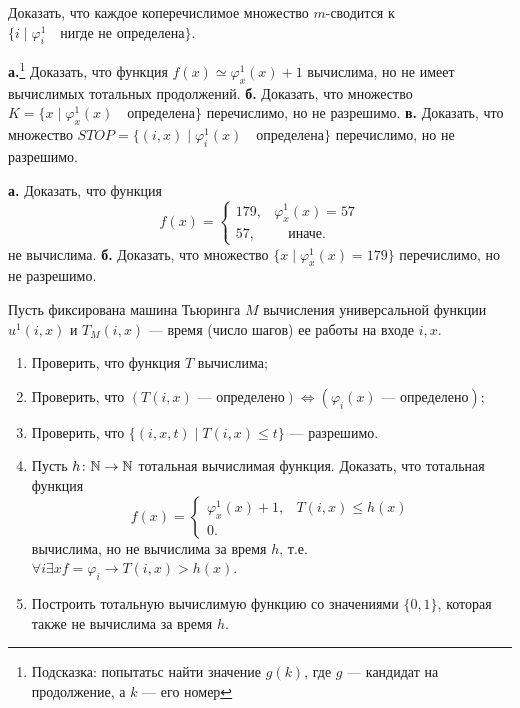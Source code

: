 \documentclass[a4paper, 12pt, num=ТА3]{listok}
\renewcommand{\phi}{\varphi}
\begin{document}
\begin{problem}
	Доказать, что каждое коперечислимое множество $m$-сводится к $\{i \mid \phi^1_i\quad\text{нигде не определена}\}$.
\end{problem}
\begin{problem}
	\textbf{а.}\footnote{Подсказка: попытатьс найти значение $g(k)$, где $g$ --- кандидат на продолжение, а $k$ --- его номер}
	Доказать, что функция $f(x) \simeq \phi^1_x(x) + 1$ вычислима, но не имеет вычислимых тотальных продолжений.
	\textbf{б.} Доказать, что множество $K = \{x \mid \phi^1_x(x)\quad\text{определена}\}$ перечислимо, но не разрешимо.
	\textbf{в.} Доказать, что множество $STOP = \{(i, x) \mid \phi^1_i(x) \quad\text{определена}\}$ перечислимо, но не разрешимо.
\end{problem}
\begin{problem}
	\textbf{а.} Доказать, что функция
	\[
		f(x) = \left \{ \begin{aligned}
				179, & \phi^1_x(x) = 57 \\
				57, & \quad \text{иначе.}
			\end{aligned} \right .
	\]
	не вычислима.
	\textbf{б.} Доказать, что множество $\{x \mid \phi^1_x(x) = 179\}$ перечислимо, но не разрешимо.
\end{problem}
\begin{problem}
	Пусть фиксирована машина Тьюринга $M$ вычисления универсальной функции
	$u^1(i, x)$ и $T_M(i, x)$ --- время (число шагов) ее работы на входе $i, x$.
	\begin{enumerate}
		\item Проверить, что функция $T$ вычислима;
		\item Проверить, что $(T (i, x) \text{ --- определено}) \Leftrightarrow (φ_i(x) \text{ --- определено})$;
		\item Проверить, что $\{(i, x, t) \mid T(i, x) \le t\}$ --- разрешимо.
		\item Пусть $h \colon \mathbb{N} \to \mathbb{N}$ тотальная вычислимая функция.
			Доказать, что тотальная функция
			\[
				f(x) = \left \{ \begin{aligned}
						\phi^1_x(x) + 1, & T(i, x) \le h(x) \\
						0.
					\end{aligned} \right .
			\]
			вычислима, но не вычислима за время $h$, т.е. $\forall{i} \exists{x} f = \phi_i \to T (i, x) > h(x)$.
		\item Построить тотальную вычислимую функцию со значениями $\{0,1\}$, которая также не вычислима за время $h$.
	\end{enumerate}
\end{problem}
\end{document}
